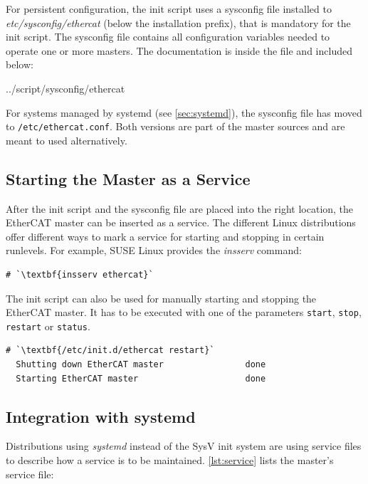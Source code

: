\documentclass[a4paper,12pt,BCOR=6mm,bibtotoc,idxtotoc]{scrbook}
\begin{document}
For persistent configuration, the init script uses a sysconfig file installed
to \textit{etc/sysconfig/ethercat} (below the installation prefix), that is
mandatory for the init script. The sysconfig file contains all configuration
variables needed to operate one or more masters. The documentation is inside
the file and included below:


    {../script/sysconfig/ethercat}

For systems managed by systemd (see \autoref{sec:systemd}), the sysconfig file
has moved to \lstinline+/etc/ethercat.conf+. Both versions are part of the
master sources and are meant to used alternatively.

\subsection{Starting the Master as a Service}
\label{sec:service}

After the init script and the sysconfig file are placed into the right
location, the EtherCAT master can be inserted as a service. The different Linux
distributions offer different ways to mark a service for starting and stopping
in certain runlevels. For example, SUSE Linux provides the \textit{insserv}
command:

\begin{lstlisting}
# `\textbf{insserv ethercat}`
\end{lstlisting}

The init script can also be used for manually starting and stopping
the EtherCAT master. It has to be executed with one of the parameters
\texttt{start}, \texttt{stop}, \texttt{restart} or \texttt{status}.

\begin{lstlisting}[gobble=2]
  # `\textbf{/etc/init.d/ethercat restart}`
  Shutting down EtherCAT master                done
  Starting EtherCAT master                     done
\end{lstlisting}

\subsection{Integration with systemd}
\label{sec:systemd}

Distributions using \textit{systemd} instead of the SysV init system are using service files to describe how a service is to be maintained. \autoref{lst:service} lists the master's service file:
\end{document}
